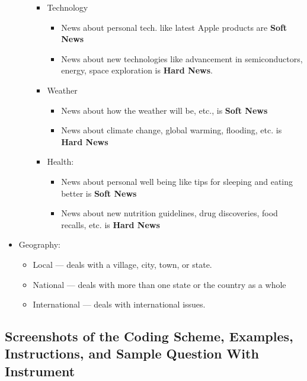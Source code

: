 \documentclass[12pt, letterpaper]{article}
\begin{document}
\begin{itemize}
\begin{itemize}
            \begin{itemize}
                \item    Technology
                    \begin{itemize}
                        \item News about personal tech. like latest Apple products are \textbf{Soft News}
                        \item News about new technologies like advancement in semiconductors, energy, space exploration is \textbf{Hard News}.
                    \end{itemize}
                \item Weather
                    \begin{itemize}
                        \item News about how the weather will be, etc., is \textbf{Soft News}
                        \item News about climate change, global warming, flooding, etc. is \textbf{Hard News}
                    \end{itemize}

                \item    Health:
                    \begin{itemize}
                        \item News about personal well being like tips for sleeping and eating better is \textbf{Soft News}
                        \item News about new nutrition guidelines, drug discoveries, food recalls, etc. is \textbf{Hard News}
                    \end{itemize}
            \end{itemize}
        \end{itemize}
    \item Geography:
        \begin{itemize}
            \item Local — deals with a village, city, town, or state.
            \item National — deals with more than one state or the country as a whole
            \item International — deals with international issues.
        \end{itemize}
\end{itemize}

\clearpage
\subsection{Screenshots of the Coding Scheme, Examples, Instructions, and Sample Question With Instrument}
\label{appendix:screenshots}
\end{document}
